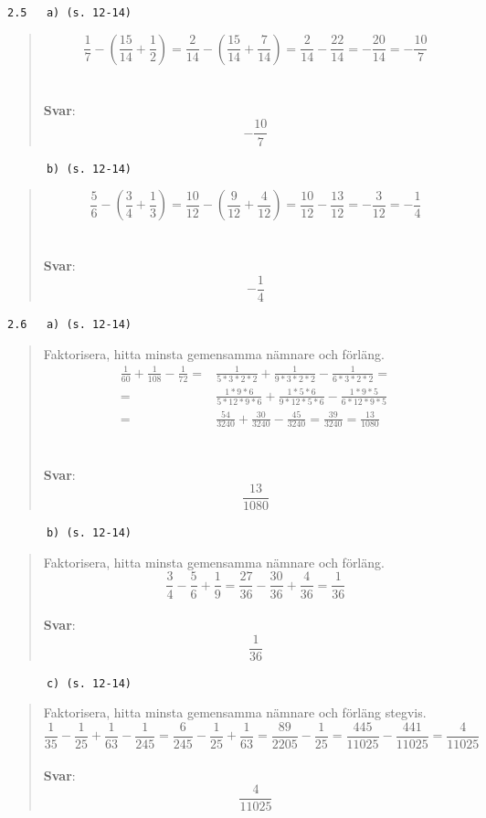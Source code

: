 \documentclass[a4paper]{article}
\newcommand{\tskcol}[1]{\textcolor{tskcol}{#1}}
\begin{document}
	\texttt{\tskcol{2.5~~~a) (s. 12-14)}}
	\begin{quotation}
		\noindent
		\[\frac{1}{7}-\left(\frac{15}{14}+\frac{1}{2}\right)=\frac{2}{14}-\left(\frac{15}{14}+\frac{7}{14}\right)=\frac{2}{14}-\frac{22}{14}=-\frac{20}{14}=-\frac{10}{7}\]
		\\ \\
		\textbf{Svar}: \[-\frac{10}{7}\]
	\end{quotation}
	
	\texttt{\tskcol{~~~~~~b) (s. 12-14)}}
	\begin{quotation}
		\noindent
		\[\frac{5}{6}-\left(\frac{3}{4}+\frac{1}{3}\right)=\frac{10}{12}-\left(\frac{9}{12}+\frac{4}{12}\right)=\frac{10}{12}-\frac{13}{12}=-\frac{3}{12}=-\frac{1}{4}\]
		\\ \\
		\textbf{Svar}: \[-\frac{1}{4}\]
	\end{quotation}
	
	\pagebreak
	\texttt{\tskcol{2.6~~~a) (s. 12-14)}}
	\begin{quotation}
		\noindent
		Faktorisera, hitta minsta gemensamma nämnare och förläng.
		\begin{align*}
			\frac{1}{60}+\frac{1}{108}-\frac{1}{72}=&
			\frac{1}{5*3*2*2}+\frac{1}{9*3*2*2}-\frac{1}{6*3*2*2}= \\
			=&\frac{1*9*6}{5*12*9*6}+\frac{1*5*6}{9*12*5*6}-\frac{1*9*5}{6*12*9*5} \\
			=&\frac{54}{3240}+\frac{30}{3240}-\frac{45}{3240}=\frac{39}{3240}=\frac{13}{1080}
		\end{align*}
		\\ \\
		\textbf{Svar}: \[\frac{13}{1080}\]
	\end{quotation}
	
	\texttt{\tskcol{~~~~~~b) (s. 12-14)}}
	\begin{quotation}
		\noindent
		Faktorisera, hitta minsta gemensamma nämnare och förläng.
		\[\frac{3}{4}-\frac{5}{6}+\frac{1}{9}=\frac{27}{36}-\frac{30}{36}+\frac{4}{36}=\frac{1}{36}\]
		\\
		\textbf{Svar}: \[\frac{1}{36}\]
	\end{quotation}
	
	\texttt{\tskcol{~~~~~~c) (s. 12-14)}}
	\begin{quotation}
		\noindent
		Faktorisera, hitta minsta gemensamma nämnare och förläng stegvis.
		\[\frac{1}{35}-\frac{1}{25}+\frac{1}{63}-\frac{1}{245}=
		\frac{6}{245}-\frac{1}{25}+\frac{1}{63}=
		\frac{89}{2205}-\frac{1}{25}=
		\frac{445}{11025}-\frac{441}{11025}=
		\frac{4}{11025}\]
		\\
		\textbf{Svar}: \[\frac{4}{11025}\]
	\end{quotation}
	
\end{document}
